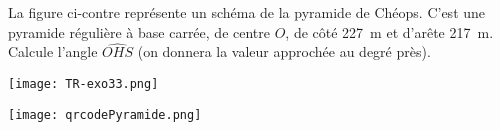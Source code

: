 
\begin{minipage}{0.38\linewidth}
La figure ci-contre représente un schéma
  de la pyramide de Chéops. C'est une pyramide régulière à base
  carrée, de centre $O$, de côté 227~m et d'arête 217~m.\\
Calcule l'angle $\widehat{OHS}$ (on donnera la valeur approchée
au degré près).
\end{minipage}
\hfill
\begin{minipage}{0.48\linewidth}
\texttt{[image: TR-exo33.png]} 
\end{minipage}
\hfill
\begin{minipage}{0.1\linewidth}
\texttt{[image: qrcodePyramide.png]} 
\end{minipage}